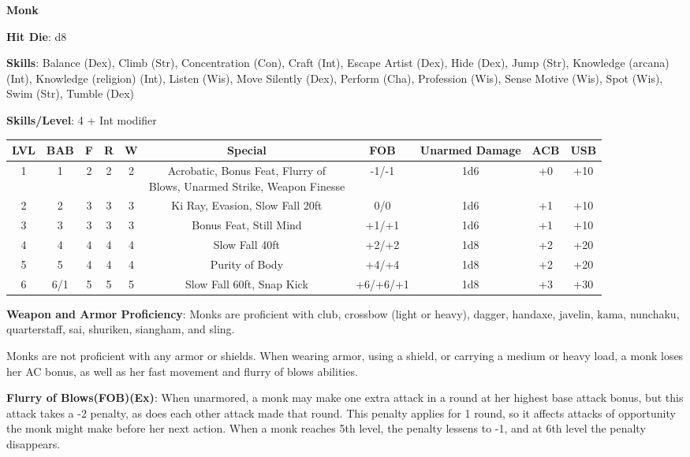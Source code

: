\textbf{\huge{Monk}}

\textbf{Hit Die}: d8

\textbf{Skills}: Balance (Dex), Climb (Str), Concentration (Con), Craft (Int), Escape Artist (Dex), Hide (Dex), Jump (Str), Knowledge (arcana) (Int), Knowledge (religion) (Int), Listen (Wis), Move Silently (Dex), Perform (Cha), Profession (Wis), Sense Motive (Wis), Spot (Wis), Swim (Str), Tumble (Dex)

\textbf{Skills/Level}: 4 + Int modifier

\begin{center}
\begin{adjustwidth}{-4cm}{}
\begin{small}
\begin{tabular}{| c | c | c | c | c | c | c | c | c | c |}
\hline
LVL &BAB &F &R &W &Special &FOB &Unarmed Damage &ACB &USB \\
\hline
1 &1 &2 &2 &2 &\makecell{Acrobatic, Bonus Feat, Flurry of\\ Blows, Unarmed Strike, Weapon Finesse} &-1/-1 &1d6 &+0 &+10 \\
2 &2 &3 &3 &3 &Ki Ray, Evasion, Slow Fall 20ft &0/0 &1d6 &+1 &+10 \\
3 &3 &3 &3 &3 &Bonus Feat, Still Mind &+1/+1 &1d6 &+1 &+10 \\
4 &4 &4 &4 &4 &Slow Fall 40ft &+2/+2 &1d8 &+2 &+20 \\
5 &5 &4 &4 &4 &Purity of Body &+4/+4 &1d8 &+2 &+20 \\
6 &6/1 &5 &5 &5 &Slow Fall 60ft, Snap Kick &+6/+6/+1 &1d8 &+3 &+30 \\
\hline
\end{tabular}
\end{small}
\end{adjustwidth}
\end{center}

\textbf{Weapon and Armor Proficiency}: Monks are proficient with club, crossbow (light or heavy), dagger, handaxe, javelin, kama, nunchaku, quarterstaff, sai, shuriken, siangham, and sling.

Monks are not proficient with any armor or shields. When wearing armor, using a shield, or carrying a medium or heavy load, a monk loses her AC bonus, as well as her fast movement and flurry of blows abilities.

\textbf{Flurry of Blows(FOB)(Ex)}: When unarmored, a monk may make one extra attack in a round at her highest base attack bonus, but this attack takes a -2 penalty, as does each other attack made that round. This penalty applies for 1 round, so it affects attacks of opportunity the monk might make before her next action. When a monk reaches 5th level, the penalty lessens to -1, and at 6th level the penalty disappears.

